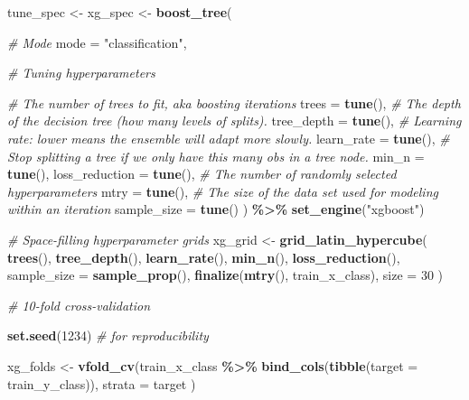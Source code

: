 \documentclass[
]{book}
\newenvironment{Shaded}{\begin{snugshade}}{\end{snugshade}}
\newcommand{\CommentTok}[1]{\textcolor[rgb]{0.56,0.35,0.01}{\textit{#1}}}
\newcommand{\DataTypeTok}[1]{\textcolor[rgb]{0.13,0.29,0.53}{#1}}
\newcommand{\DecValTok}[1]{\textcolor[rgb]{0.00,0.00,0.81}{#1}}
\newcommand{\KeywordTok}[1]{\textcolor[rgb]{0.13,0.29,0.53}{\textbf{#1}}}
\newcommand{\NormalTok}[1]{#1}
\newcommand{\OperatorTok}[1]{\textcolor[rgb]{0.81,0.36,0.00}{\textbf{#1}}}
\newcommand{\StringTok}[1]{\textcolor[rgb]{0.31,0.60,0.02}{#1}}
\begin{document}
\begin{Shaded}
\begin{Highlighting}[]
\NormalTok{tune\_spec \textless{}{-}}
\StringTok{  }\NormalTok{xg\_spec \textless{}{-}}\StringTok{ }\KeywordTok{boost\_tree}\NormalTok{(}

    \CommentTok{\# Mode}
    \DataTypeTok{mode =} \StringTok{"classification"}\NormalTok{,}

    \CommentTok{\# Tuning hyperparameters}

    \CommentTok{\# The number of trees to fit, aka boosting iterations}
    \DataTypeTok{trees =} \KeywordTok{tune}\NormalTok{(),}
    \CommentTok{\# The depth of the decision tree (how many levels of splits).}
    \DataTypeTok{tree\_depth =} \KeywordTok{tune}\NormalTok{(),}
    \CommentTok{\# Learning rate: lower means the ensemble will adapt more slowly.}
    \DataTypeTok{learn\_rate =} \KeywordTok{tune}\NormalTok{(),}
    \CommentTok{\# Stop splitting a tree if we only have this many obs in a tree node.}
    \DataTypeTok{min\_n =} \KeywordTok{tune}\NormalTok{(),}
    \DataTypeTok{loss\_reduction =} \KeywordTok{tune}\NormalTok{(),}
    \CommentTok{\# The number of randomly selected hyperparameters}
    \DataTypeTok{mtry =} \KeywordTok{tune}\NormalTok{(),}
    \CommentTok{\# The size of the data set used for modeling within an iteration}
    \DataTypeTok{sample\_size =} \KeywordTok{tune}\NormalTok{()}
\NormalTok{  ) }\OperatorTok{\%\textgreater{}\%}
\StringTok{  }\KeywordTok{set\_engine}\NormalTok{(}\StringTok{"xgboost"}\NormalTok{)}

\CommentTok{\# Space{-}filling hyperparameter grids}
\NormalTok{xg\_grid \textless{}{-}}\StringTok{ }\KeywordTok{grid\_latin\_hypercube}\NormalTok{(}
  \KeywordTok{trees}\NormalTok{(),}
  \KeywordTok{tree\_depth}\NormalTok{(),}
  \KeywordTok{learn\_rate}\NormalTok{(),}
  \KeywordTok{min\_n}\NormalTok{(),}
  \KeywordTok{loss\_reduction}\NormalTok{(),}
  \DataTypeTok{sample\_size =} \KeywordTok{sample\_prop}\NormalTok{(),}
  \KeywordTok{finalize}\NormalTok{(}\KeywordTok{mtry}\NormalTok{(), train\_x\_class),}
  \DataTypeTok{size =} \DecValTok{30}
\NormalTok{)}

\CommentTok{\# 10{-}fold cross{-}validation}

\KeywordTok{set.seed}\NormalTok{(}\DecValTok{1234}\NormalTok{) }\CommentTok{\# for reproducibility}

\NormalTok{xg\_folds \textless{}{-}}\StringTok{ }\KeywordTok{vfold\_cv}\NormalTok{(train\_x\_class }\OperatorTok{\%\textgreater{}\%}\StringTok{ }\KeywordTok{bind\_cols}\NormalTok{(}\KeywordTok{tibble}\NormalTok{(}\DataTypeTok{target =}\NormalTok{ train\_y\_class)),}
  \DataTypeTok{strata =}\NormalTok{ target}
\NormalTok{)}
\end{Highlighting}
\end{Shaded}
\end{document}

